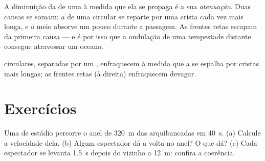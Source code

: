 \begin{definition}[Atenuação]\label{def:g12:mechanical-waves:attenuation}
A diminuição da  de uma  à medida que ela se propaga é a sua
\emph{atenuação}. Duas causas se somam: a  de uma
 circular se reparte por uma crista cada vez mais longa, e
o meio absorve um pouco durante a passagem. As frentes retas escapam da
primeira causa --- e é por isso que a ondulação de uma tempestade
distante consegue atravessar um oceano.
\end{definition}

\begin{omfigure}

{\small {} circulares, separadas por um ,
enfraquecem à medida que a  se espalha por cristas mais longas; as
frentes retas (à direita) enfraquecem devagar.}
\end{omfigure}

\section{Exercícios}

\begin{exercise}[$\star$]\label{exo:g12:mechanical-waves:1}
Uma  de estádio percorre o anel de \qty{320}{m} das arquibancadas em
\qty{40}{s}. (a) Calcule a velocidade dela. (b) Algum espectador dá a
volta no anel? O que dá? (c) Cada espectador se levanta \qty{1.5}{s}
depois do vizinho a \qty{12}{m}: confira a coerência.
\end{exercise}

